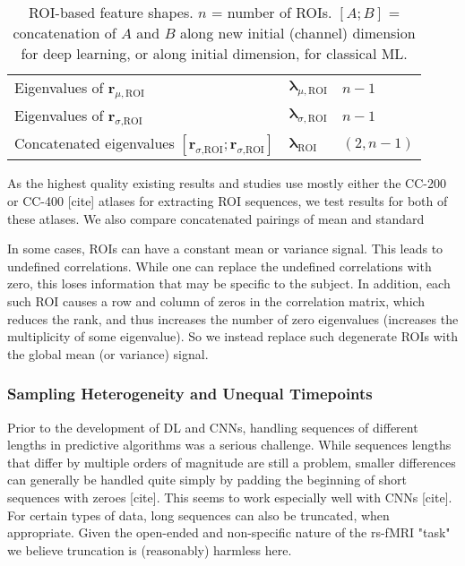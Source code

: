 \documentclass[10pt]{article}
\newcommand{\tsub}[2]{\mathbf{#1}_{\text{#2}}}
\begin{document}
\begin{table}
\begin{tabular}{lll}
    Eigenvalues of \(\mathbf{r}_{\mu,\text{ROI}}\)                                             & \(\mathbf{\lambda}_{\mu,\text{ROI}}\)      & \(n-1\)       \\
    Eigenvalues of \(\mathbf{r}_{\sigma\text{,ROI}}\)                                          & \(\mathbf{\lambda}_{\sigma,\text{ROI}}\)   & \(n-1\)       \\
    Concatenated eigenvalues \([\mathbf{r}_{\sigma\text{,ROI}}; \mathbf{r}_{\sigma\text{,ROI}}]\)  & \(\tsub{\lambda}{ROI}\)                & \((2, n-1)\)  \\
		\bottomrule
	\end{tabular}
	\label{tab:feature-shapes}
	\caption{ROI-based feature shapes. \(n\) = number of ROIs. \([A;B]\) = concatenation of \(A\) and \(B\) along new initial (channel) dimension for deep learning, or along initial dimension, for classical ML.}
\end{table}

As the highest quality existing results and studies use mostly either the CC-200 or CC-400 [cite] atlases for extracting
ROI sequences, we test results for both of these atlases. We also compare concatenated pairings of mean and standard

In some cases, ROIs can have a constant mean or variance signal. This leads to undefined
correlations. While one can replace the undefined correlations with zero, this loses information
that may be specific to the subject. In addition, each such ROI causes a row and column of zeros in
the correlation matrix, which reduces the rank, and thus increases the number of zero eigenvalues
(increases the multiplicity of some eigenvalue). So we instead replace such degenerate ROIs with the
global mean (or variance) signal.

\subsubsection{Sampling Heterogeneity and Unequal Timepoints}

Prior to the development of DL and CNNs, handling sequences of different lengths in predictive
algorithms was a serious challenge. While sequences lengths that differ by multiple orders of
magnitude are still a problem, smaller differences can generally be handled quite simply by padding
the beginning  of short sequences with zeroes [cite]. This seems to work especially well with CNNs
[cite]. For certain types of data, long sequences can also be truncated, when appropriate. Given the
open-ended and non-specific nature of the rs-fMRI "task" we believe truncation is (reasonably)
harmless here.
\end{document}
